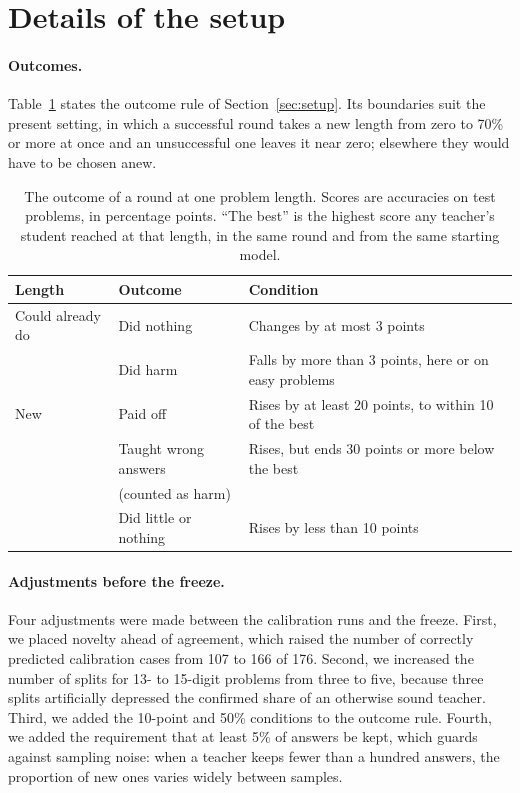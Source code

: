 \section{Details of the setup}
\label{app:setup-details}
\label{app:settings}

\paragraph{Outcomes.} Table~\ref{tab:outcomes} states the outcome rule of
Section~\ref{sec:setup}. Its boundaries suit the present setting, in which a
successful round takes a new length from zero to 70\% or more at once and an
unsuccessful one leaves it near zero; elsewhere they would have to be chosen
anew.

\begin{table}[htbp]
\centering
\caption{The outcome of a round at one problem length. Scores are accuracies
  on test problems, in percentage points. ``The best'' is the highest score
  any teacher's student reached at that length, in the same round and from the
  same starting model.}
\label{tab:outcomes}
\small
\begin{tabular}{@{}lll@{}}
\toprule
Length & Outcome & Condition \\
\midrule
Could already do & Did nothing & Changes by at most 3 points \\
 & Did harm & Falls by more than 3 points, here or on easy problems \\
\addlinespace
New & Paid off & Rises by at least 20 points, to within 10 of the best \\
 & Taught wrong answers & Rises, but ends 30 points or more below the best \\
 & \quad (counted as harm) & \\
 & Did little or nothing & Rises by less than 10 points \\
\bottomrule
\end{tabular}
\end{table}


\paragraph{Adjustments before the freeze.}
Four adjustments were made between the calibration runs and the freeze.
First, we placed novelty ahead of agreement, which raised the number of
correctly predicted calibration cases from 107 to 166 of 176. Second, we
increased the number of splits for 13- to 15-digit problems from three to
five, because three splits artificially depressed the confirmed share of an
otherwise sound teacher. Third, we added the 10-point and 50\% conditions to
the outcome rule. Fourth, we added the requirement that at least 5\% of
answers be kept, which guards against sampling noise: when a teacher keeps
fewer than a hundred answers, the proportion of new ones varies widely
between samples.


